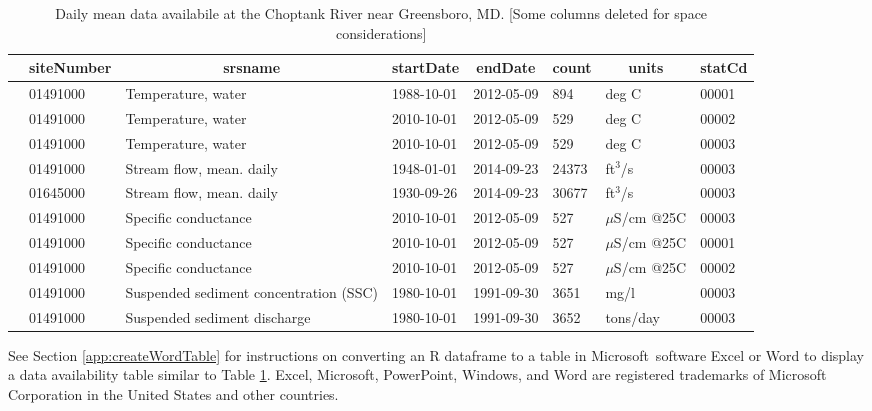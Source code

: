 \documentclass[a4paper,11pt]{article}\usepackage[]{graphicx}\usepackage[]{color}
\begin{document}
\begin{table}[ht]
\caption{Daily mean data availabile at the Choptank River near Greensboro, MD. [Some columns deleted for space considerations]} 
\label{tab:gda}
{\footnotesize
\begin{tabular}{rlllllll}
  \hline
 & \multicolumn{1}{c}{\textbf{\textsf{siteNumber}}} & \multicolumn{1}{c}{\textbf{\textsf{srsname}}} & \multicolumn{1}{c}{\textbf{\textsf{startDate}}} & \multicolumn{1}{c}{\textbf{\textsf{endDate}}} & \multicolumn{1}{c}{\textbf{\textsf{count}}} & \multicolumn{1}{c}{\textbf{\textsf{units}}} & \multicolumn{1}{c}{\textbf{\textsf{statCd}}} \\ 
  \hline
 & 01491000 & Temperature, water & 1988-10-01 & 2012-05-09 & 894 & deg C & 00001 \\ 
  [5pt] & 01491000 & Temperature, water & 2010-10-01 & 2012-05-09 & 529 & deg C & 00002 \\ 
  [5pt] & 01491000 & Temperature, water & 2010-10-01 & 2012-05-09 & 529 & deg C & 00003 \\ 
  [5pt] & 01491000 & Stream flow, mean. daily & 1948-01-01 & 2014-09-23 & 24373 & ft$^3$/s & 00003 \\ 
  [5pt] & 01645000 & Stream flow, mean. daily & 1930-09-26 & 2014-09-23 & 30677 & ft$^3$/s & 00003 \\ 
  [5pt] & 01491000 & Specific conductance & 2010-10-01 & 2012-05-09 & 527 & $\mu$S/cm @25C & 00003 \\ 
  [5pt] & 01491000 & Specific conductance & 2010-10-01 & 2012-05-09 & 527 & $\mu$S/cm @25C & 00001 \\ 
  [5pt] & 01491000 & Specific conductance & 2010-10-01 & 2012-05-09 & 527 & $\mu$S/cm @25C & 00002 \\ 
  [5pt] & 01491000 & Suspended sediment concentration (SSC) & 1980-10-01 & 1991-09-30 & 3651 & mg/l & 00003 \\ 
  [5pt] & 01491000 & Suspended sediment discharge & 1980-10-01 & 1991-09-30 & 3652 & tons/day & 00003 \\ 
   \hline
\end{tabular}
}
\end{table}


See Section \ref{app:createWordTable} for instructions on converting an R dataframe to a table in Microsoft\textregistered\ software Excel or Word to display a data availability table similar to Table \ref{tab:gda}. Excel, Microsoft, PowerPoint, Windows, and Word are registered trademarks of Microsoft Corporation in the United States and other countries.
\end{document}
